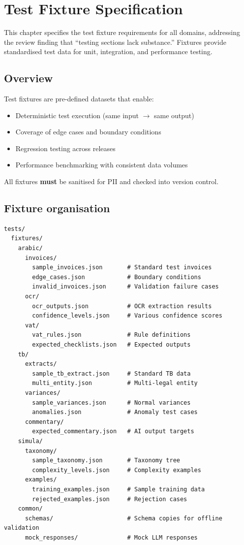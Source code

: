 \chapter{Test Fixture Specification}\label{ch:test-fixtures}

This chapter specifies the test fixture requirements for all domains, addressing
the review finding that ``testing sections lack substance.'' Fixtures provide
standardised test data for unit, integration, and performance testing.

\section{Overview}

Test fixtures are pre-defined datasets that enable:
\begin{itemize}
  \item Deterministic test execution (same input $\rightarrow$ same output)
  \item Coverage of edge cases and boundary conditions
  \item Regression testing across releases
  \item Performance benchmarking with consistent data volumes
\end{itemize}

All fixtures \textbf{must} be sanitised for PII and checked into version control.

\section{Fixture organisation}

\begin{lstlisting}[basicstyle=\ttfamily\small,caption={Test fixture directory structure.}]
tests/
  fixtures/
    arabic/
      invoices/
        sample_invoices.json       # Standard test invoices
        edge_cases.json            # Boundary conditions
        invalid_invoices.json      # Validation failure cases
      ocr/
        ocr_outputs.json           # OCR extraction results
        confidence_levels.json     # Various confidence scores
      vat/
        vat_rules.json             # Rule definitions
        expected_checklists.json   # Expected outputs
    tb/
      extracts/
        sample_tb_extract.json     # Standard TB data
        multi_entity.json          # Multi-legal entity
      variances/
        sample_variances.json      # Normal variances
        anomalies.json             # Anomaly test cases
      commentary/
        expected_commentary.json   # AI output targets
    simula/
      taxonomy/
        sample_taxonomy.json       # Taxonomy tree
        complexity_levels.json     # Complexity examples
      examples/
        training_examples.json     # Sample training data
        rejected_examples.json     # Rejection cases
    common/
      schemas/                     # Schema copies for offline validation
      mock_responses/              # Mock LLM responses
\end{lstlisting}


